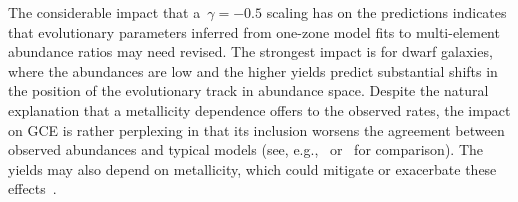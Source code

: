 \documentclass[foo.tex]{subfiles}
\begin{document}
The considerable impact that a~$\gamma = -0.5$ scaling has on the predictions
indicates that evolutionary parameters inferred from one-zone model fits to
multi-element abundance ratios may need revised.
The strongest impact is for dwarf galaxies, where the abundances are low and
the higher yields predict substantial shifts in the position of the
evolutionary track in abundance space.
{\color{red}
Despite the natural explanation that a metallicity dependence offers to the
observed rates, the impact on GCE is rather perplexing in that its inclusion
worsens the agreement between observed abundances and typical models
(see, e.g.,~\citealp{Johnson2021} or~\citealp{Spitoni2021} for comparison).
The yields may also depend on metallicity, which could mitigate or exacerbate
these effects~\citep{Gronow2021}.
}
\end{document}
